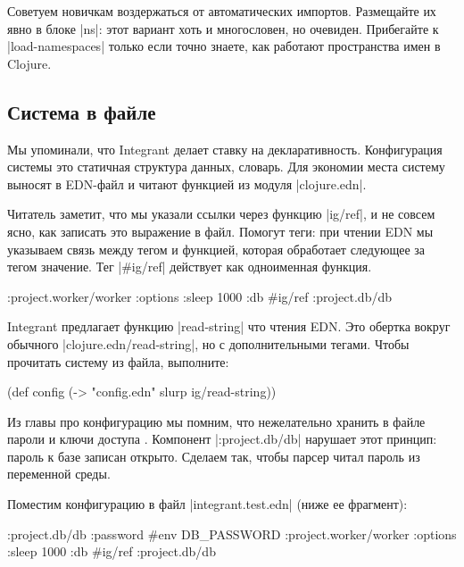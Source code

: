 Советуем новичкам воздержаться от автоматических импортов. Размещайте их явно в
блоке \spverb|ns|: этот вариант хоть и многословен, но очевиден. Прибегайте к
\spverb|load-namespaces| только если точно знаете, как работают пространства
имен в Clojure.

\subsection{Система в файле}

Мы упоминали, что Integrant делает ставку на
декларативность. Конфигурация системы это статичная структура данных,
словарь. Для экономии места систему выносят в EDN-файл и читают функцией из
модуля \spverb|clojure.edn|.

Читатель заметит, что мы указали ссылки через функцию \spverb|ig/ref|, и не
совсем ясно, как записать это выражение в файл. Помогут теги: при чтении EDN мы
указываем связь между тегом и функцией, которая обработает следующее за тегом
значение. Тег \spverb|#ig/ref| действует как одноименная функция.

\begin{english}
  \begin{clojure}
{:project.worker/worker {:options {:sleep 1000}
                         :db #ig/ref :project.db/db}}
  \end{clojure}
\end{english}

Integrant предлагает функцию \spverb|read-string| что чтения EDN. Это обертка
вокруг обычного \spverb|clojure.edn/read-string|, но с дополнительными
тегами. Чтобы прочитать систему из файла, выполните:

\begin{english}
  \begin{clojure}
(def config
  (-> "config.edn" slurp ig/read-string))
  \end{clojure}
\end{english}

Из главы про конфигурацию мы помним, что нежелательно хранить в файле пароли и
ключи доступа . Компонент \spverb|:project.db/db| нарушает
этот принцип: пароль к базе записан открыто. Сделаем так, чтобы парсер читал
пароль из переменной среды.

Поместим конфигурацию в файл \spverb|integrant.test.edn| (ниже ее фрагмент):

\begin{english}
  \begin{clojure}
{:project.db/db {:password #env DB_PASSWORD}
 :project.worker/worker {:options {:sleep 1000}
                         :db #ig/ref :project.db/db}}
  \end{clojure}
\end{english}

